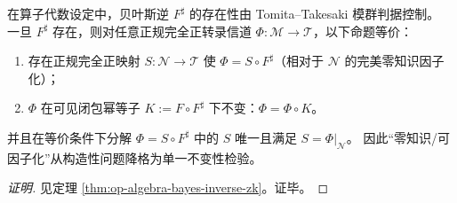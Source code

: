 \begin{conclusion}\label{con:xi-terminal-bayesian-inverse-zk-factorization-invariance}
在算子代数设定中，贝叶斯逆 \(F^\sharp\) 的存在性由 Tomita--Takesaki 模群判据控制。
一旦 \(F^\sharp\) 存在，则对任意正规完全正转录信道 \(\Phi:\mathcal{M}\to\mathcal{T}\)，以下命题等价：
\begin{enumerate}
  \item 存在正规完全正映射 \(S:\mathcal{N}\to\mathcal{T}\) 使 \(\Phi=S\circ F^\sharp\)（相对于 \(\mathcal{N}\) 的完美零知识因子化）；
  \item \(\Phi\) 在可见闭包幂等子 \(K:=F\circ F^\sharp\) 下不变：\(\Phi=\Phi\circ K\)。
\end{enumerate}
并且在等价条件下分解 \(\Phi=S\circ F^\sharp\) 中的 \(S\) 唯一且满足 \(S=\Phi|_{\mathcal{N}}\)。
因此“零知识/可因子化”从构造性问题降格为单一不变性检验。
\end{conclusion}
\begin{proof}[证明]
见定理 \ref{thm:op-algebra-bayes-inverse-zk}。证毕。
\end{proof}

